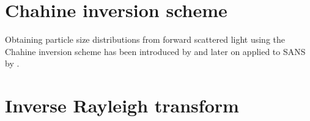 \section{Chahine inversion scheme}
Obtaining particle size distributions from forward scattered light using the Chahine inversion scheme has been introduced by \cite{Santer1983} and later on applied to SANS by \cite{Sen2014}.

\section{Inverse Rayleigh transform} 